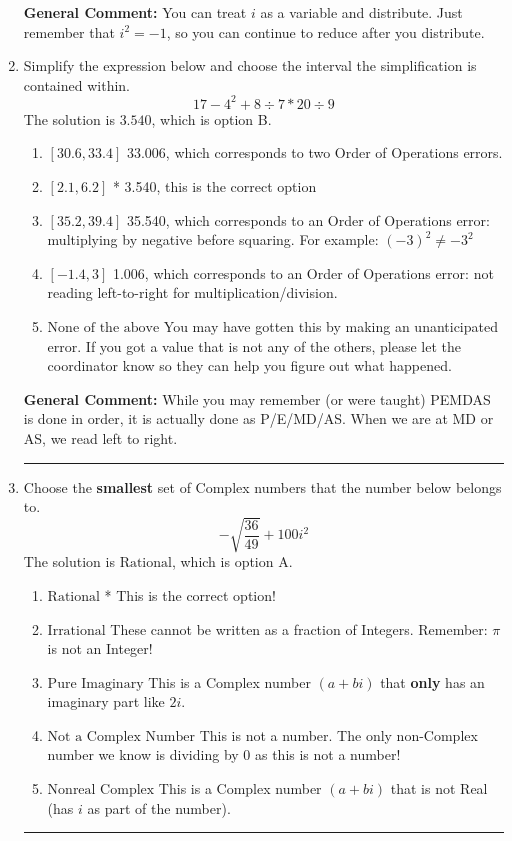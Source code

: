 \documentclass{extbook}[14pt]
\newcommand{\litem}[1]{\item #1

\rule{\textwidth}{0.4pt}}
\begin{document}
\begin{enumerate}
{\textbf{General Comment:} You can treat $i$ as a variable and distribute. Just remember that $i^2=-1$, so you can continue to reduce after you distribute.
}
\litem{
Simplify the expression below and choose the interval the simplification is contained within.
\[ 17 - 4^2 + 8 \div 7 * 20 \div 9 \]
The solution is \( 3.540 \), which is option B.\begin{enumerate}[label=\Alph*.]
\item \( [30.6, 33.4] \)
 33.006, which corresponds to two Order of Operations errors.
\item \( [2.1, 6.2] \)
* 3.540, this is the correct option
\item \( [35.2, 39.4] \)
 35.540, which corresponds to an Order of Operations error: multiplying by negative before squaring. For example: $(-3)^2 \neq -3^2$
\item \( [-1.4, 3] \)
 1.006, which corresponds to an Order of Operations error: not reading left-to-right for multiplication/division.
\item \( \text{None of the above} \)
 You may have gotten this by making an unanticipated error. If you got a value that is not any of the others, please let the coordinator know so they can help you figure out what happened.
\end{enumerate}

\textbf{General Comment:} While you may remember (or were taught) PEMDAS is done in order, it is actually done as P/E/MD/AS. When we are at MD or AS, we read left to right.
}
\litem{
Choose the \textbf{smallest} set of Complex numbers that the number below belongs to.
\[ -\sqrt{\frac{36}{49}} + 100i^2 \]
The solution is \( \text{Rational} \), which is option A.\begin{enumerate}[label=\Alph*.]
\item \( \text{Rational} \)
* This is the correct option!
\item \( \text{Irrational} \)
These cannot be written as a fraction of Integers. Remember: $\pi$ is not an Integer!
\item \( \text{Pure Imaginary} \)
This is a Complex number $(a+bi)$ that \textbf{only} has an imaginary part like $2i$.
\item \( \text{Not a Complex Number} \)
This is not a number. The only non-Complex number we know is dividing by 0 as this is not a number!
\item \( \text{Nonreal Complex} \)
This is a Complex number $(a+bi)$ that is not Real (has $i$ as part of the number).
\end{enumerate}

}
\end{enumerate}
\end{document}
